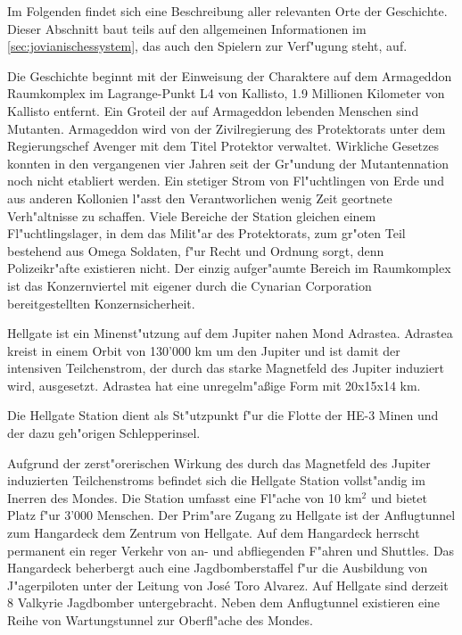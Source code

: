 

Im Folgenden findet sich eine Beschreibung aller relevanten Orte der Geschichte. Dieser Abschnitt baut teils auf den allgemeinen Informationen im \cref{sec:jovianischessystem}, das auch den Spielern zur Verf"ugung steht, auf.


Die Geschichte beginnt mit der Einweisung der Charaktere auf dem Armageddon Raumkomplex im Lagrange-Punkt L4 von Kallisto, 1.9 Millionen Kilometer von Kallisto entfernt. Ein Gro\3teil der auf Armageddon lebenden Menschen sind Mutanten. Armageddon wird von der Zivilregierung
des Protektorats unter dem Regierungschef Avenger mit dem Titel Protektor verwaltet. Wirkliche Gesetzes konnten in den vergangenen vier Jahren seit der Gr"undung der Mutantennation noch nicht etabliert werden. Ein stetiger Strom von Fl"uchtlingen von Erde und aus anderen Kollonien l"asst den Verantworlichen wenig Zeit geortnete Verh"altnisse zu schaffen. Viele Bereiche der Station gleichen einem Fl"uchtlingslager, in dem das Milit"ar des Protektorats, zum gr"o\3ten Teil bestehend aus Omega Soldaten, f"ur Recht und Ordnung sorgt, denn Polizeikr"afte existieren nicht. Der einzig aufger"aumte Bereich im Raumkomplex ist das Konzernviertel mit eigener durch die Cynarian Corporation bereitgestellten Konzernsicherheit.


Hellgate ist ein Minenst"utzung auf dem Jupiter nahen Mond Adrastea. Adrastea kreist in einem Orbit von 130'000 km um den Jupiter und
ist damit der intensiven Teilchenstrom, der durch das starke Magnetfeld des Jupiter induziert wird, ausgesetzt. Adrastea hat eine unregelm"aßige Form mit 20x15x14 km.

Die Hellgate Station dient als St"utzpunkt f"ur die Flotte der HE-3 Minen und der dazu geh"origen Schlepperinsel. 

Aufgrund der zerst"orerischen Wirkung des durch das Magnetfeld des Jupiter induzierten Teilchenstroms befindet sich die Hellgate Station vollst"andig im Inerren des Mondes. Die Station umfasst eine Fl"ache von 10 km$^{2}$ und bietet Platz f"ur 3'000 Menschen. Der Prim"are Zugang zu Hellgate ist der Anflugtunnel zum Hangardeck dem Zentrum von Hellgate. Auf dem Hangardeck herrscht permanent ein reger Verkehr von an- und abfliegenden F"ahren und Shuttles. Das Hangardeck beherbergt auch eine Jagdbomberstaffel f"ur die Ausbildung von J"agerpiloten unter der Leitung von Jos\'{e} \frqq{}Toro\flqq{} Alvarez. Auf Hellgate sind derzeit 8 Valkyrie Jagdbomber untergebracht. Neben dem Anflugtunnel existieren eine Reihe von Wartungstunnel zur Oberfl"ache des Mondes.

